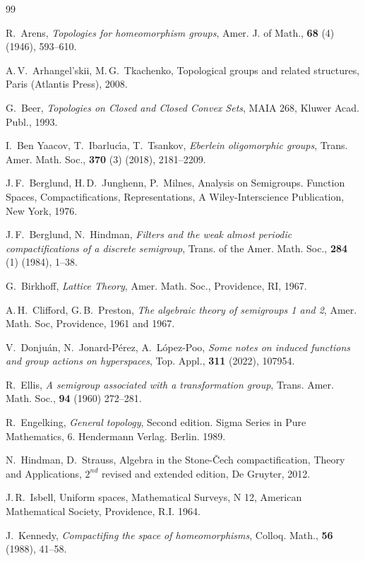 \documentclass{amsart}
\begin{document}
\begin{thebibliography}{99}

  R.~Arens, {\it Topologies for homeomorphism groups}, Amer. J. of Math., {\bf 68} (4) (1946), 593--610. 

 A.\,V.~Arhangel'skii, M.\,G.~Tkachenko, Topological
groups and related structures, Paris (Atlantis Press), 2008.

  G.~Beer, {\it Topologies on Closed and Closed Convex Sets}, MAIA 268, Kluwer Acad. Publ., 1993.

 I.~Ben Yaacov, T.~Ibarluc\'{\i}a, T.~Tsankov, {\it Eberlein oligomorphic groups}, Trans. Amer. Math. Soc., {\bf  370} (3) (2018), 2181--2209.

 J.\,F.~Berglund, H.\,D.~Junghenn, P.~Milnes, Analysis on Semigroups. Function Spaces, Compactifications, Representations, A Wiley-Interscience Publication, New York, 1976.

 J.\,F.~Berglund, N.~Hindman, {\it Filters and the weak almost periodic compactifications of a discrete semigroup}, Trans. of the
Amer. Math. Soc., {\bf 284} (1) (1984), 1--38.

 G.~Birkhoff, {\it Lattice Theory}, Amer. Math. Soc., Providence, RI, 1967.

 A.\,H.~Clifford, G.\,B.~Preston, {\it The algebraic theory of semigroups 1 and 2}, Amer. Math. Soc, Providence, 1961 and 1967.

 V.~Donju\' an, N.~Jonard-P\' erez, A.~L\' opez-Poo, {\it Some notes on induced functions and group actions on hyperspaces}, Top. Appl., {\bf 311} (2022), 107954.

 R.~Ellis, {\it A semigroup associated with a transformation group}, Trans. Amer. Math. Soc., {\bf 94} (1960) 272--281.

 R.~Engelking,  {\it General topology}, Second edition. Sigma Series in Pure Mathematics, 6. Hendermann Verlag. Berlin. 1989.

 N.~Hindman, D.~Strauss, Algebra in the Stone-\v Cech compactification, Theory and Applications, $2^{nd}$ revised and extended edition,  De Gruyter, 2012.

 J.\,R.~Isbell, Uniform spaces, Mathematical Surveys, N 12, American Mathematical Society, Providence, R.I. 1964.

 J.~Kennedy, {\it Compactifing the space of homeomorphisms}, Colloq. Math., {\bf 56} (1988), 41--58.  


\end{thebibliography}
\end{document}
